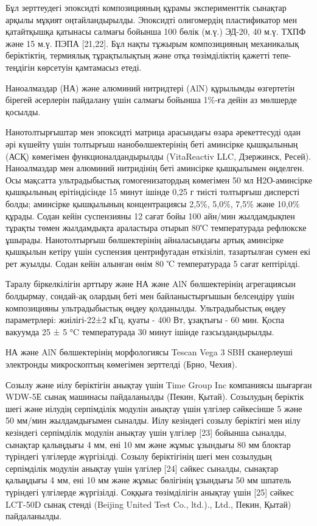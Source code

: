 \begin{multicols}{2}
Бұл зерттеудегі эпоксидті композицияның құрамы эксперименттік сынақтар
арқылы мұқият оңтайландырылды. Эпоксидті олигомердің пластификатор мен
қатайтқышқа қатынасы салмағы бойынша 100 бөлік (м.ү.) ЭД-20, 40 м.ү.
ТХПФ және 15 м.ү. ПЭПА {[}21,22{]}. Бұл нақты тұжырым композицияның
механикалық беріктіктің, термиялық тұрақтылықтың және отқа төзімділіктің
қажетті тепе-теңдігін көрсетуін қамтамасыз етеді.

Наноалмаздар (НА) және алюминий нитридтері (AlN) құрылымды өзгертетін
бірегей әсерлерін пайдалану үшін салмағы бойынша 1\%-ға дейін аз
мөлшерде қосылды.

Нанотолтырғыштар мен эпоксидті матрица арасындағы өзара әрекеттесуді
одан әрі күшейту үшін толтырғыш нанобөлшектерінің беті аминсірке
қышқылының (АСҚ) көмегімен функционалдандырылды (VitaReactiv LLC,
Дзержинск, Ресей). Наноалмаздар мен алюминий нитридінің беті аминсірке
қышқылымен өңделген. Осы мақсатта ультрадыбыстық гомогенизатордың
көмегімен 50 мл Н2О-аминсірке қышқылының ерітіндісінде 15 минут ішінде
0,25 г тиісті толтырғыш дисперсті болды; аминсірке қышқылының
концентрациясы 2,5\%, 5,0\%, 7,5\% және 10,0\% құрады. Содан кейін
суспензияны 12 сағат бойы 100 айн/мин жылдамдықпен тұрақты төмен
жылдамдықта араластыра отырып 80℃ температурада рефлюкске ұшырады.
Нанотолтырғыш бөлшектерінің айналасындағы артық аминсірке қышқылын
кетіру үшін суспензия центрифугадан өткізіліп, тазартылған сумен екі рет
жуылды. Содан кейін алынған өнім 80 ℃ температурада 5 сағат кептірілді.

Таралу біркелкілігін арттыру және НА және AlN бөлшектерінің агрегациясын
болдырмау, сондай-ақ олардың беті мен байланыстырғышын белсендіру үшін
композицияны ультрадыбыстық өңдеу қолданылды. Ультрадыбыстық өңдеу
параметрлері: жиілігі-22±2 кГц, қуаты - 400 Вт, ұзақтығы - 60 мин. Қоспа
вакуумда 25 ± 5 °C температурада 30 минут ішінде газсыздандырылды.

НА және AlN бөлшектерінің морфологиясы Tescan Vega 3 SBH сканерлеуші
электронды микроскоптың көмегімен зерттелді (Брно, Чехия).

Созылу және иілу беріктігін анықтау үшін Time Group Inc компаниясы
шығарған WDW-5Е сынақ машинасы пайдаланылды (Пекин, Қытай). Созылудың
беріктік шегі және иілудің серпімділік модулін анықтау үшін үлгілер
сәйкесінше 5 және 50 мм/мин жылдамдығымен сыналды. Иілу кезіндегі созылу
беріктігі мен иілу кезіндегі серпімділік модулін анықтау үшін үлгілер
{[}23{]} бойынша сыналды, сынақтар қалыңдығы 4 мм, ені 10 мм және жұмыс
ұзындығы 80 мм блоктар түріндегі үлгілерде жүргізілді. Созылу
беріктігінің шегі мен созылудың серпімділік модулін анықтау үшін үлгілер
{[}24{]} сәйкес сыналды, сынақтар қалыңдығы 4 мм, ені 10 мм және жұмыс
бөлігінің ұзындығы 50 мм шпатель түріндегі үлгілерде жүргізілді. Соққыға
төзімділігін анықтау үшін {[}25{]} сәйкес LCT-50D сынақ стенді (Beijing
United Test Co., ltd.)., Ltd., Пекин, Қытай) пайдаланылды.


\end{multicols}
